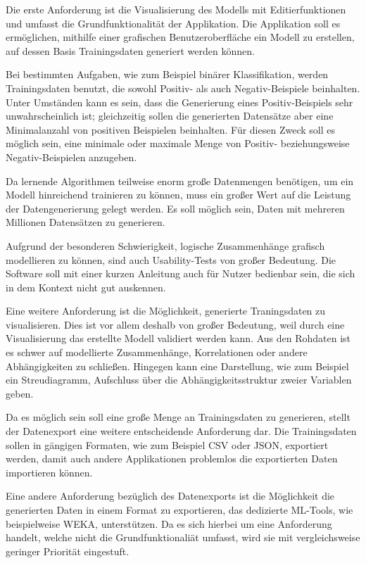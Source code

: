 Die erste Anforderung ist die Visualisierung des Modells mit Editierfunktionen und umfasst die Grundfunktionalität der Applikation. Die Applikation soll es ermöglichen, mithilfe einer grafischen Benutzeroberfläche ein Modell zu erstellen, auf dessen Basis Trainingsdaten generiert werden können.

Bei bestimmten Aufgaben, wie zum Beispiel binärer Klassifikation, werden Trainingsdaten benutzt, die sowohl Positiv- als auch Negativ-Beispiele beinhalten. Unter Umständen kann es sein, dass die Generierung eines Positiv-Beispiels sehr unwahrscheinlich ist; gleichzeitig sollen die generierten Datensätze aber eine Minimalanzahl von positiven Beispielen beinhalten. Für diesen Zweck soll es möglich sein, eine minimale oder maximale Menge von Positiv- beziehungsweise Negativ-Beispielen anzugeben.

Da lernende Algorithmen teilweise enorm große Datenmengen benötigen, um ein Modell hinreichend trainieren zu können, muss ein großer Wert auf die Leistung der Datengenerierung gelegt werden. Es soll möglich sein, Daten mit mehreren Millionen Datensätzen zu generieren.

Aufgrund der besonderen Schwierigkeit, logische Zusammenhänge grafisch modellieren zu können, sind auch Usability-Tests von großer Bedeutung. Die Software soll mit einer kurzen Anleitung auch für Nutzer bedienbar sein, die sich in dem Kontext nicht gut auskennen.

Eine weitere Anforderung ist die Möglichkeit, generierte Traningsdaten zu visualisieren. Dies ist vor allem deshalb von großer Bedeutung, weil durch eine Visualisierung das erstellte Modell validiert werden kann. Aus den Rohdaten ist es schwer auf modellierte Zusammenhänge, Korrelationen oder andere Abhängigkeiten zu schließen. Hingegen kann eine Darstellung, wie zum Beispiel ein Streudiagramm, Aufschluss über die Abhängigkeitsstruktur zweier Variablen geben.

Da es möglich sein soll eine große Menge an Trainingsdaten zu generieren, stellt der Datenexport eine weitere entscheidende Anforderung dar. Die Trainingsdaten sollen in gängigen Formaten, wie zum Beispiel CSV oder JSON, exportiert werden, damit auch andere Applikationen problemlos die exportierten Daten importieren können.

Eine andere Anforderung bezüglich des Datenexports ist die Möglichkeit die generierten Daten in einem Format zu exportieren, das dedizierte \ac{ML}-Tools, wie beispielweise WEKA, unterstützen. Da es sich hierbei um eine Anforderung handelt, welche nicht die Grundfunktionaliät umfasst, wird sie mit vergleichsweise geringer Priorität eingestuft.

